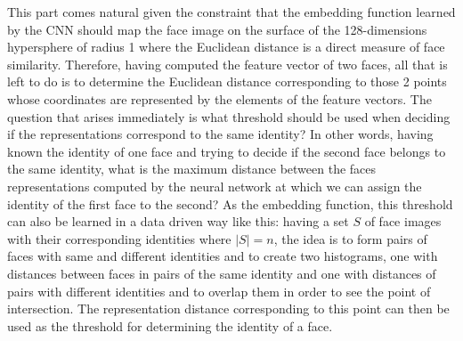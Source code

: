 This part comes natural given the constraint that the embedding function learned by the CNN should map the face image on the surface of the 128-dimensions hypersphere of radius 1 where the Euclidean distance is a direct measure of face similarity. Therefore, having computed the feature vector of two faces, all that is left to do is to determine the Euclidean distance corresponding to those 2 points whose coordinates are represented by the elements of the feature vectors. 
The question that arises immediately is what threshold should be used when deciding if the representations correspond to the same identity? In other words, having known the identity of one face and trying to decide if the second face belongs to the same identity, what is the maximum distance between the faces representations computed by the neural network at which we can assign the identity of the first face to the second? As the embedding function, this threshold can also be learned in a data driven way like this: having a set $S$ of face images with their corresponding identities where $|S| = n$, the idea is to form pairs of faces with same and different identities and to create two histograms, one with distances between faces in pairs of the same identity and one with distances of pairs with different identities and to overlap them in order to see the point of intersection. The representation distance corresponding to this point can then be used as the threshold for determining the identity of a face.

